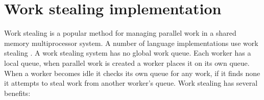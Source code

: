 %
%




\section{Work stealing implementation}
\label{sec:work_stealing}

Work stealing is a popular method for managing parallel work in a shared
memory multiprocessor system.
A number of language implementations use work stealing \citep{XXX}.
A work stealing system has no global work queue.
Each worker has a local queue, when parallel work is created a worker
places it on its own queue.
When a worker becomes idle it checks its own queue for any work,
if it finds none it attempts to steal work from another worker's queue.
Work stealing has several benefits:

